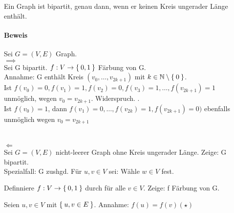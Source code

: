 \documentclass{../../meta/tudscript}
\begin{document}
    \setcounter{section}{13}
    \setcounter{subsection}{15}

        Ein Graph ist bipartit, genau dann, wenn er keinen Kreis ungerader 
        Länge enthält.
    \paragraph{Beweis}
        Sei $G = (V, E)$ Graph.\\
    
        \underline{$\implies$}\\

        Sei G bipartit. $f: V \rightarrow \Set{0, 1}$ Färbung von G. \\
        
        Annahme: G enthält Kreis $(v_0, \ldots, v_{2k+1})$ mit $k \in \mathbb{N} 
        \setminus \Set{0}$. \\
        
        Ist $f(v_0) = 0, f(v_1) = 1, f(v_2) = 0, f(v_3) = 1, \ldots, f(v_{2k+1}) = 1$
        unmöglich, wegen $v_0 = v_{2k + 1}$. Widerspruch. \lightning.\\
        
        Ist $f (v_0) = 1$, dann $f(v_1) = 0, \ldots, f(v_{2k}) = 1, f(v_{2k+1}) = 0)$
        ebenfalls unmöglich wegen $v_0 = v_{2k +1}$ \lightning\\
        \\
        \\
   
        \underline{$\Leftarrow$}\\

        Sei $G = (V, E)$ nicht-leerer Graph ohne Kreis ungerader Länge.
        Zeige: G bipartit. \\
        
        Spezialfall: G zushgd.
        Für $u, v \in V$ sei:
        Wähle $w \in V$ fest.

            
        Definniere $f: V \rightarrow \Set{0, 1}$ durch 
        für alle $v \in V$. Zeige: f Färbung von G.

        Seien $u, v \in V$ mit $\Set{u, v \in E}$.
        Annahme: $f (u) = f (v) (\star)$
\end{document}
